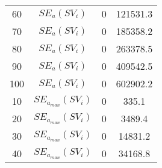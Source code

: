 \begin{table}[H]
\begin{tabular}{cc|cc}
60                                                          & $SE_{a}(SV_i)$                                                     & 0                                                             & 121531.3                                                              \\
70                                                          & $SE_{a}(SV_i)$                                                     & 0                                                             & 185358.2                                                              \\
80                                                          & $SE_{a}(SV_i)$                                                     & 0                                                             & 263378.5                                                              \\
90                                                          & $SE_{a}(SV_i)$                                                     & 0                                                             & 409542.5                                                              \\
100                                                         & $SE_{a}(SV_i)$                                                     & 0                                                             & 602902.2                                                              \\
10                                                          & $SE_{a_{max}}(SV_i)$                                                         & 0                                                             & 335.1                                                                 \\
20                                                          & $SE_{a_{max}}(SV_i)$                                                         & 0                                                             & 3489.4                                                                \\
30                                                          & $SE_{a_{max}}(SV_i)$                                                         & 0                                                             & 14831.2                                                               \\
40                                                          & $SE_{a_{max}}(SV_i)$                                                         & 0                                                             & 34168.8                                                               \\

\end{tabular}
\end{table}
